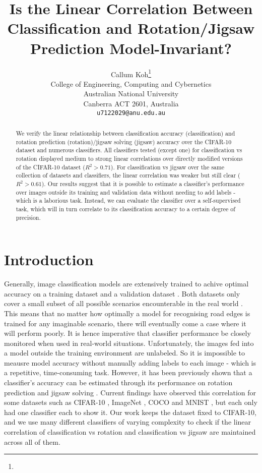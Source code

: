 \documentclass{article}
\title{Is the Linear Correlation Between Classification and Rotation/Jigsaw Prediction Model-Invariant?}
\author{%
  Callum Koh\thanks{} \\
  College of Engineering, Computing and Cybernetics\\
  Australian National University\\
  Canberra ACT 2601, Australia \\
  \texttt{u7122029@anu.edu.au} \\
}
\begin{document}
\maketitle


\begin{abstract}
We verify the linear relationship between classification accuracy (classification) and rotation prediction (rotation)/jigsaw solving (jigsaw) accuracy over the CIFAR-10 dataset and numerous classifiers. All classifiers tested (except one) for classification vs rotation displayed medium to strong linear correlations over directly modified versions of the CIFAR-10 dataset ($R^2 > 0.71$). For classification vs jigsaw over the same collection of datasets and classifiers, the linear correlation was weaker but still clear ($R^2 > 0.61$). Our results suggest that it is possible to estimate a classifier's performance over images outside its training and validation data without needing to add labels - which is a laborious task. Instead, we can evaluate the classifier over a self-supervised task, which will in turn correlate to its classification accuracy to a certain degree of precision.
\end{abstract}

\section{Introduction}
Generally, image classification models are extensively trained to achive optimal accuracy on a training dataset and a validation dataset \cite{dridi2021supervised, nasteski2017overview}. Both datasets only cover a small subset of all possible scenarios encounterable in the real world \cite{gopalan2011domain}. This means that no matter how optimally a model for recognising road edges is trained for any imaginable scenario, there will eventually come a case where it will perform poorly. It is hence imperative that classifier performance be closely monitored when used in real-world situations. Unfortunately, the images fed into a model outside the training environment are unlabeled. So it is impossible to meausre model accuracy without manually adding labels to each image - which is a repetitive, time-consuming task. However, it has been previously shown that a classifier's accuracy can be estimated through its performance on rotation prediction and jigsaw solving \cite{Deng:ICML2021}. Current findings have observed this correlation for some datasets such as CIFAR-10 \cite{krizhevsky2009learning}, ImageNet \cite{deng2009imagenet}, COCO \cite{cocodataset} and MNIST \cite{deng2012mnist}, but each only had one classifier each to show it. Our work keeps the dataset fixed to CIFAR-10, and we use many different classifiers of varying complexity to check if the linear correlation of classification vs rotation and classification vs jigsaw are maintained across all of them.
\end{document}
